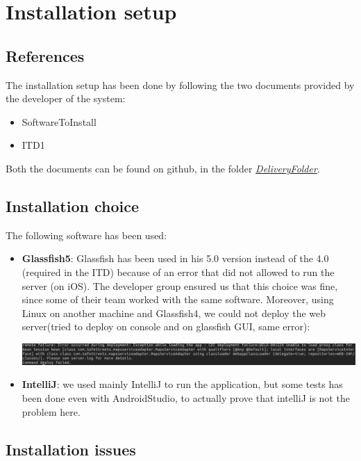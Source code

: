 \documentclass[../ATD.tex]{subfiles}
\begin{document}
    \chapter{Installation setup}\label{ch:installation-setup}
    \section{References}\label{sec:references}
    The installation setup has been done by following the two documents provided by the developer of the system:
    \begin{itemize}
        \item SoftwareToInstall
        \item ITD1
    \end{itemize}
    Both the documents can be found on github, in the folder \href{https://github.com/gianfi12/AbboAccordiBonetti/tree/master/DeliveryFolder}{\emph{DeliveryFolder}}.

    \section{Installation choice}\label{sec:installation-choice}
    The following software has been used:
    \begin{itemize}
        \item \textbf{Glassfish5}: Glassfish has been used in his 5.0 version instead of the 4.0 (required in the ITD) because of an error that did not allowed to run the server (on iOS).
        The developer group ensured us that this choice was fine, since some of their team worked with the same software.
        Moreover, using Linux on another machine and Glassfish4, we could not deploy the web server(tried to deploy on console and on glassfish GUI, same error):

        \includegraphics[scale = 0.3]{assets/deployError.png}

        \item \textbf{IntelliJ}: we used mainly IntelliJ to run the application, but some tests has been done even with AndroidStudio, to actually prove that
        intelliJ is not the problem here.
    \end{itemize}
    \newpage
    \section{Installation issues}\label{sec:installation-issues}
\end{document}
